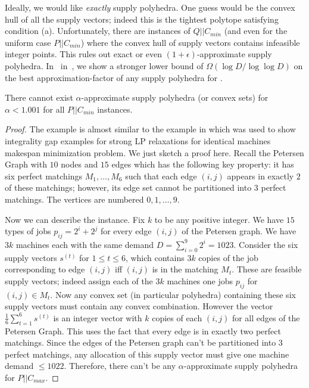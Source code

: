 Ideally, we would like {\em exactly} supply polyhedra. One guess would be the convex hull of all the supply vectors; indeed this is the tightest polytope satisfying condition (a).
Unfortunately, there are instances of $Q||C_{min}$ (and even for the uniform case $P||C_{min}$) where the convex hull of supply vectors contains infeasible integer points.
This rules out exact or even $(1+\epsilon)$-approximate supply polyhedra. In~ in~, we show a stronger lower bound of $\Omega(\log D/\log \log D)$ on the best approximation-factor of any supply polyhedra for \cckp.
\begin{theorem}\label{fthm:no-supp}
	There cannot exist $\alpha$-approximate supply polyhedra (or convex sets) for $\alpha < 1.001$ for all  $P||C_{min}$ instances.
\end{theorem}
\begin{proof}
The example is almost similar to the example in \cite{KurpiszMMMVW16} which was used to show integrality gap examples for strong LP relaxations for identical machines makespan minimization problem.
We just sketch a proof here. Recall the Petersen Graph with $10$ nodes and $15$ edges which has the following key property: it has six perfect matchings $M_1,\ldots,M_6$ such that each edge $(i,j)$ appears in exactly $2$ of these matchings; however, its edge set cannot be partitioned into $3$ perfect matchings.
The vertices are numbered $0,1,\ldots,9$.

Now we can describe the instance. Fix $k$ to be any positive integer.
We have $15$ types of jobs $p_{ij} = 2^i + 2^j$ for every edge $(i,j)$ of the Petersen graph.
We have $3k$ machines each with the same demand $D = \sum_{i=0}^9 2^i = 1023$.
Consider the six supply vectors $s^{(t)}$ for $1\leq t\leq 6$,  which contains $3k$ copies of the job corresponding to edge $(i,j)$ iff $(i,j)$ is in the matching $M_t$.
These are feasible supply vectors; indeed assign each of the $3k$ machines one jobs $p_{ij}$ for $(i,j) \in M_t$. Now any convex set (in particular polyhedra) containing these six supply vectors
must contain any convex combination. However the vector $\frac{1}{6}\sum_{t=1}^6 s^{(t)}$ is an integer vector with $k$ copies of each $(i,j)$ for all edges of the Petersen Graph.
This uses the fact that every edge is in exactly two perfect matchings. Since the edges of the  Petersen graph can't be partitioned into $3$ perfect matchings, any allocation of this supply vector
must give one machine demand $\leq 1022$. Therefore, there can't be any $\alpha$-approximate supply polyhedra for $P||C_{max}$.
\end{proof}
